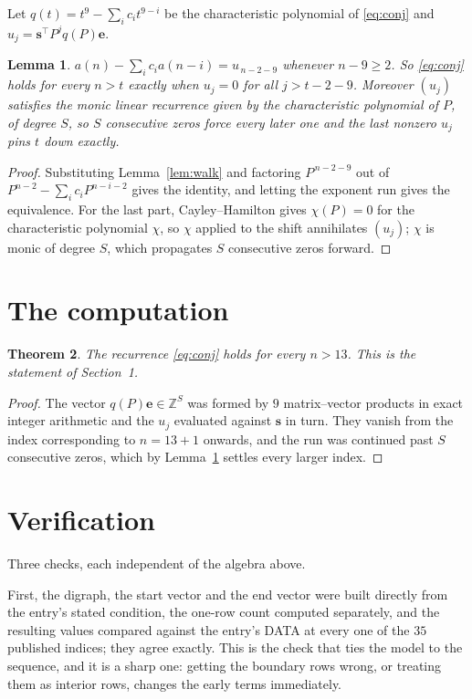 \documentclass[11pt,a4paper]{article}
\theoremstyle{plain}
\newtheorem{theorem}{Theorem}
\newtheorem{lemma}[theorem]{Lemma}
\theoremstyle{definition}
\begin{document}
Let $q(t)=t^{9}-\sum_i c_i t^{9-i}$ be the characteristic polynomial of
\eqref{eq:conj} and $u_j=\mathbf{s}^{\!\top}P^{j}q(P)\mathbf{e}$.

\begin{lemma}\label{lem:crit}
$a(n)-\sum_i c_i a(n-i)=u_{\,n-2-9}$ whenever $n-9\ge2$. So \eqref{eq:conj}
holds for every $n>t$ exactly when $u_j=0$ for all $j>t-2-9$. Moreover $(u_j)$
satisfies the monic linear recurrence given by the characteristic polynomial of $P$, of
degree $S$, so $S$ consecutive zeros force every later one and the last nonzero $u_j$ pins
$t$ down exactly.
\end{lemma}

\begin{proof}
Substituting Lemma~\ref{lem:walk} and factoring $P^{\,n-2-9}$ out of
$P^{n-2}-\sum_i c_i P^{n-i-2}$ gives the identity, and letting the exponent run gives the
equivalence. For the last part, Cayley--Hamilton gives $\chi(P)=0$ for the characteristic
polynomial $\chi$, so $\chi$ applied to the shift annihilates $(u_j)$; $\chi$ is monic of
degree $S$, which propagates $S$ consecutive zeros forward.
\end{proof}

\section{The computation}

\begin{theorem}
The recurrence \eqref{eq:conj} holds for every $n>13$. This is the statement of
Section~1.
\end{theorem}

\begin{proof}
The vector $q(P)\mathbf{e}\in\mathbb{Z}^{S}$ was formed by $9$ matrix--vector
products in exact integer arithmetic and the $u_j$ evaluated against $\mathbf{s}$ in turn.
They vanish from the index corresponding to $n=13+1$ onwards, and the run was continued
past $S$ consecutive zeros, which by Lemma~\ref{lem:crit} settles every larger index.
\end{proof}

\section{Verification}

Three checks, each independent of the algebra above.

First, the digraph, the start vector and the end vector were built directly from the
entry's stated condition, the one-row count computed separately, and the resulting values
compared against the entry's DATA at every one of the $35$ published indices; they
agree exactly. This is the check that ties the model to the sequence, and it is a sharp one:
getting the boundary rows wrong, or treating them as interior rows, changes the early terms
immediately.
\end{document}
